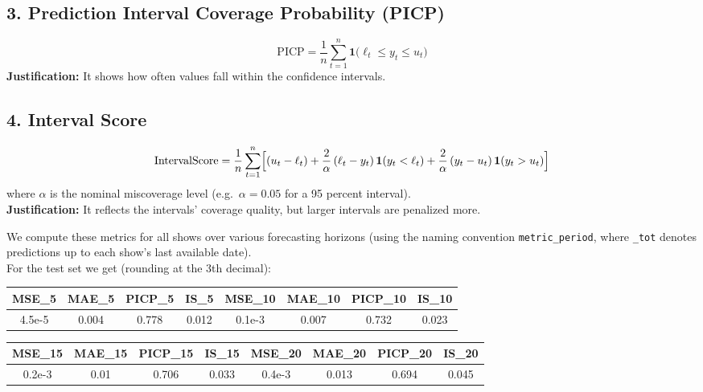 \documentclass{Configuration_Files/PoliMi3i_thesis}
\begin{document}
\subsection*{3. Prediction Interval Coverage Probability (PICP)}
\[
\mathrm{PICP}
= \frac{1}{n} \sum_{t=1}^{n} \mathbf{1}\bigl(\ell_{t} \le y_{t} \le u_{t}\bigr)
\]
\textbf{Justification:} It shows how often values fall within the confidence intervals.

\subsection*{4. Interval Score}
\[
\mathrm{IntervalScore}
= \frac{1}{n}\sum_{t=1}^{n} \Bigl[(u_{t} - \ell_{t})
+ \frac{2}{\alpha}\,( \ell_{t} - y_{t})\,\mathbf{1}(y_{t} < \ell_{t})
+ \frac{2}{\alpha}\,( y_{t} - u_{t})\,\mathbf{1}(y_{t} > u_{t})\Bigr]
\]
where \(\alpha\) is the nominal miscoverage level (e.g.\ \(\alpha=0.05\) for a 95 percent interval). \\ 
\textbf{Justification:}  
It reflects the intervals’ coverage quality, but larger intervals are penalized more.

We compute these metrics for all shows over various forecasting horizons (using the naming convention \texttt{metric\_period}, where \texttt{\_tot} denotes predictions up to each show’s last available date).
\\
For the test set we get (rounding at the 3th decimal):

\begin{table}[H]
  \centering
  \begin{tabular}{| c | c | c | c | c | c | c | c |}
    \hline
    MSE\_5 & MAE\_5 & PICP\_5 & IS\_5 & MSE\_10 & MAE\_10 & PICP\_10 & IS\_10 \\ \hline
    4.5e-5 & 0.004 & 0.778 & 0.012 & 0.1e-3 & 0.007 & 0.732 & 0.023 \\ \hline
  \end{tabular}
\end{table}

\begin{table}[H]
  \centering
  \begin{tabular}{| c | c | c | c | c | c | c | c |}
    \hline
    MSE\_15 & MAE\_15 & PICP\_15 & IS\_15 & MSE\_20 & MAE\_20 & PICP\_20 & IS\_20 \\ \hline
    0.2e-3 & 0.01 & 0.706 & 0.033 & 0.4e-3 & 0.013 & 0.694 & 0.045 \\ \hline
  \end{tabular}
\end{table}
\end{document}
